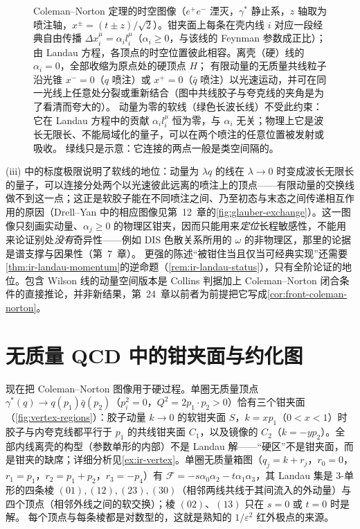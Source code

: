 \begin{figure}[htbp]
\begin{tikzpicture}
\end{tikzpicture}
\caption{Coleman--Norton 定理的时空图像（$e^+e^-$ 湮灭，$\gamma^*$ 静止系，$z$ 轴取为喷注轴，$x^\pm=(t\pm z)/\sqrt2$）。钳夹面上每条在壳内线 $i$
对应一段经典自由传播 $\Delta x_i^\mu=\alpha_i l_i^\mu$（$\alpha_i\ge0$，与该线的 Feynman 参数成正比）；由 Landau 方程，各顶点的时空位置彼此相容。离壳（硬）线的 $\alpha_i=0$，全部收缩为原点处的硬顶点 $H$；
有限动量的无质量共线粒子沿光锥 $x^-=0$（$q$ 喷注）或 $x^+=0$（$\bar q$ 喷注）以光速运动，并可在同一光线上任意处分裂或重新结合（图中共线胶子与夸克线的夹角是为了看清而夸大的）。
动量为零的软线（绿色长波长线）不受此约束：它在 Landau 方程中的贡献 $\alpha_i l_i^\mu$ 恒为零，与 $\alpha_i$ 无关；物理上它是波长无限长、不能局域化的量子，可以在两个喷注的任意位置被发射或吸收。
绿线只是示意：它连接的两点一般是类空间隔的。}
\label{fig:coleman-norton}
\end{figure}

(iii) 中的标度极限说明了软线的地位：动量为 $\lambda q$ 的线在 $\lambda\to0$ 时变成波长无限长的量子，可以连接分处两个以光速彼此远离的喷注上的顶点——有限动量的交换线做不到这一点；这正是软胶子能在不同喷注之间、乃至初态与末态之间传递相互作用的原因（Drell--Yan 中的相应图像见第~12~章的\cref{fig:glauber-exchange}）。这一图像只刻画实动量、$\alpha_j\ge0$ 的物理区钳夹，因而只能用来\emph{定位}长程敏感性，不能用来论证别处\emph{没有}奇异性——例如 DIS 色散关系所用的 $\omega$ 的非物理区，那里的论据是谱支撑与因果性（第~7~章）。%
更强的陈述“被钳住当且仅当可经典实现”还需要\cref{thm:ir-landau-momentum}的逆命题（\cref{rem:ir-landau-status}），只有全阶论证的地位。包含 Wilson 线的动量空间版本是 Collins 判据加上 Coleman--Norton 闭合条件的直接推论，并非新结果，第~24~章以前者为前提把它写成\cref{cor:front-coleman-norton}。
\section{无质量 QCD 中的钳夹面与约化图}\label{sec:ir-pinch}

现在把 Coleman--Norton 图像用于硬过程。单圈无质量顶点 $\gamma^*(q)\to q(p_1)\bar q(p_2)$（$p_i^2=0$，$Q^2=2p_1\cdot p_2>0$）恰有三个钳夹面（\cref{fig:vertex-regions}）：胶子动量 $k\to0$ 的软钳夹面 $S$，$k=xp_1$（$0<x<1$）时胶子与内夸克线都平行于 $p_1$ 的共线钳夹面 $C_1$，以及镜像的 $C_2$（$k=-yp_2$）。全部内线离壳的构型（参数单形的内部）不是 Landau 解——“硬区”不是钳夹面，而是钳夹的缺席；详细分析见\cref{ex:ir-vertex}。单圈无质量箱图（$q_j=k+r_j$，$r_0=0$，$r_1=p_1$，$r_2=p_1+p_2$，$r_3=-p_4$）有 $\mathcal F=-s\alpha_0\alpha_2-t\alpha_1\alpha_3$，其 Landau 集是 3-单形的四条棱 $(01),(12),(23),(30)$（相邻两线共线于其间流入的外动量）与四个顶点（相邻外线之间的软交换）；棱 $(02)$、$(13)$ 只在 $s=0$ 或 $t=0$ 时是解。%
每个顶点与每条棱都是对数型的，这就是熟知的 $1/\varepsilon^2$ 红外极点的来源。


